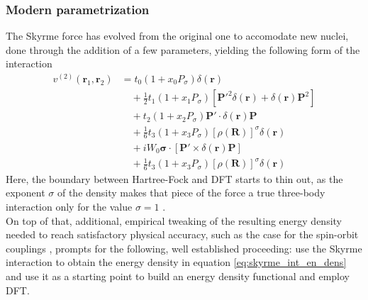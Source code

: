 \subsubsection{Modern parametrization}
The Skyrme force has evolved from the original one to accomodate new nuclei, done through the addition of a few parameters, yielding the following form of the interaction \cite{CHABANAT1997710}
    \begin{align*}
v^{(2)}(\mathbf{r}_1, \mathbf{r}_2) &= t_0 \left(1 + x_0 P_\sigma \right) \delta(\mathbf{r}) \\
&\quad + \frac{1}{2} t_1 \left(1 + x_1 P_\sigma \right) \left[ \mathbf{P}'^2 \delta(\mathbf{r}) + \delta(\mathbf{r}) \mathbf{P}^2 \right] \\
&\quad + t_2 \left(1 + x_2 P_\sigma \right) \mathbf{P}' \cdot \delta(\mathbf{r}) \mathbf{P} \\
&\quad + \frac{1}{6} t_3 \left(1 + x_3 P_\sigma \right) \left[ \rho(\mathbf{R}) \right]^\sigma \delta(\mathbf{r}) \\
&\quad + i W_0 \boldsymbol{\sigma}\cdot \left[ \mathbf{P}' \times \delta(\mathbf{r}) \mathbf{P} \right]\\
&\quad + \frac 1 6 t_3 \left(1 + x_3 P_\sigma \right) \left[ \rho(\mathbf{R}) \right]^\sigma \delta(\mathbf{r}) 
\end{align*}
Here, the boundary between Hartree-Fock and DFT starts to thin out, as the exponent $\sigma$ of the density makes that piece of the force a true three-body interaction only for the value $\sigma=1$ \cite{Erler_2010}.
\\On top of that, additional, empirical tweaking of the resulting energy density needed to reach satisfactory physical accuracy, such as the case for the spin-orbit couplings \cite{REINHARD1995467}, prompts for the following, well established proceeding: use the Skyrme interaction to obtain the energy density in equation \eqref{eq:skyrme_int_en_dens} and use it as a starting point to build an energy density functional and employ DFT.